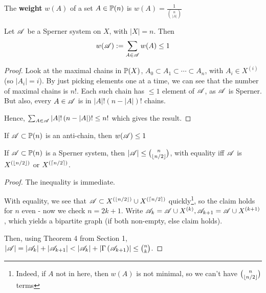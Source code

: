 \documentclass[a4paper]{article}
\begin{document}
\begin{defi}[Weight]
	The \textbf{weight} $w(A)$ of a set $A\in\P(n)$ is $w(A)=\frac{1}{\binom{n}{|A|}}$
\end{defi}

\begin{thm-num} 
	Let $\A$ be a Sperner system on $X$, with $|X|=n$. Then $$w(\A):=\sum_{A\in\A}w(A)\leq 1$$
\end{thm-num}
\begin{proof}
	Look at the maximal chains in $\P(X)$, $A_0\subset A_1\subset\cdots\subset A_n$, with $A_i\in X^{(i)}$ (so $|A_i|=i$). By just picking elements one at a time, we can see that the number of maximal chains is $n!$. Each such chain has $\leq 1$ element of $\A$, as $\A$ is Sperner. But also, every $A\in\A$ is in $|A|!\left(n-|A|\right)!$ chains.
	
	Hence, $\sum_{A\in\A}|A|!\left(n-|A|\right)!\leq n!$ which gives the result.
\end{proof}

\addtocounter{cor-num}{-1}
\begin{thm-num}
	If $\A\subset \P(n)$ is an anti-chain, then $w(\A)\leq 1$
\end{thm-num}

\begin{cor-num}
	If $\A\subset\P(n)$ is a Sperner system, then $|\A|\leq\binom{n}{\lf n/2\rf}$, with equality iff $\A$ is $X^{(\lf n/2\rf)}$ or $X^{(\lc n/2\rc)}$.
\end{cor-num}
\begin{proof}
	The inequality is immediate.
	
	With equality, we see that $\A\subset X^{(\lf n/2\rf)}\cup X^{(\lc n/2\rc)}$ quickly\footnote{Indeed, if $A$ not in here, then $w(A)$ is not minimal, so we can't have $\binom{n}{\lf n/2 \rf}$ terms}, so the claim holds for $n$ even - now we check $n=2k+1$. Write $\A_k=\A\cup X^{(k)}, \A_{k+1}=\A\cup X^{(k+1)}$, which yields a bipartite graph (if both non-empty, else claim holds).
	
	Then, using Theorem 4 from Section 1, $|\A|=\left|\A_k\right|+\left|\A_{k+1}\right|<\left|\A_k\right|+\left|\Gamma\left(\A_{k+1}\right)\right|\leq\binom{n}{k}$.
\end{proof}
\end{document}
